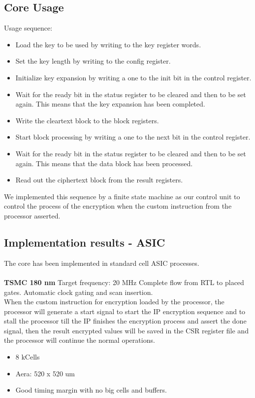 \documentclass[../main.tex]{subfiles}
\begin{document}
\subsection*{Core Usage}
Usage sequence:
\begin{itemize}
    \item Load the key to be used by writing to the key register words.
    \item Set the key length by writing to the config register.
    \item Initialize key expansion by writing a one to the init bit in the control register.
    \item Wait for the ready bit in the status register to be cleared and then to be set again. This means that the key expansion has been completed.
    \item Write the cleartext block to the block registers.
    \item Start block processing by writing a one to the next bit in the control register.
    \item Wait for the ready bit in the status register to be cleared and then to be set again. This means that the data block has been processed.
    \item Read out the ciphertext block from the result registers.
\end{itemize}
We implemented this sequence by a finite state machine as our control unit to control the process of the encryption when the custom instruction from the processor asserted.
\subsection*{Implementation results - ASIC}
The core has been implemented in standard cell ASIC processes.\\
\\\textbf{TSMC 180 nm}
Target frequency: 20 MHz Complete flow from RTL to placed gates. Automatic clock gating and scan insertion.\\
When the custom instruction for encryption loaded by the processor, the processor will generate a start signal to start the IP encryption sequence and to stall the processor till the IP finishes the encryption process and assert the done signal, then the result encrypted values will be saved in the CSR register file and the processor will continue the normal operations.
\begin{itemize}
    \item 8 kCells
    \item Aera: 520 x 520 um
    \item Good timing margin with no big cells and buffers.
\end{itemize}
\end{document}
